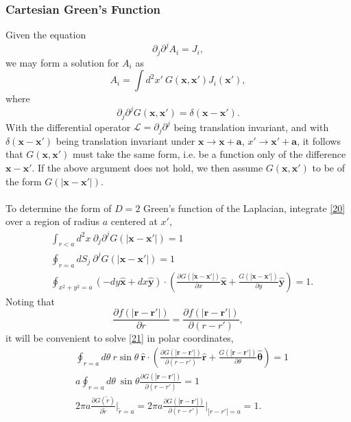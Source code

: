 \documentclass[10pt,letterpaper]{article}
\newcommand{\vect}[1]{\mathbf{#1}}
\newcommand{\vecth}[1]{\hat{\mathbf{#1}}}
\begin{document}
\subsubsection*{Cartesian Green's Function}
Given the equation
\begin{equation}
\partial_j \partial^j A_i = J_i,
\end{equation}
we may form a solution for $A_i$ as
\begin{equation}
A_i = \int d^2x'\ G(\vect x,\vect x') J_i(\vect x'),
\end{equation}
where
\begin{equation}
\partial_j \partial^j G(\vect x,\vect x') = \delta(\vect x-\vect x').\label{20}
\end{equation}
With the differential operator $\mathcal L = \partial_j \partial^j$ being translation invariant, and with $\delta(\vect x-\vect x')$ being translation invariant under $\vect x \to \vect x+\vect a$, $x'\to \vect x'+\vect a$, it follows that $G(\vect x,\vect x')$ must take the same form, i.e. be a function only of the difference $\vect x-\vect x'$. If the above argument does not hold, we then assume $G(\vect x,\vect x')$ to be of the form $G(|\vect x-\vect x'|)$. 
\\ \\
To determine the form of $D=2$ Green's function of the Laplacian, integrate \eqref{20} over a region of radius $a$ centered at $x'$,
\begin{align}
	&\int_{r<a} d^2x\  \partial_j \partial^j G(|\vect x-\vect x'|) = 1\nonumber\\
	&\oint_{r=a} dS_j\ \partial^j  G(|\vect x-\vect x'|)= 1\nonumber\\
	&\oint_{x^2+y^2=a}  \left( -dy \vecth x + dx \vecth y\right) \cdot \left(\frac{\partial G(|\vect x-\vect x'|)}{\partial x} \vecth x +
\frac{G(|\vect x-\vect x'|)}{\partial y}\vecth y\right)=1.\label{21}
\end{align}
Noting that 
\begin{equation}
\frac{\partial f(|\vect r-\vect r'|)}{\partial r} = \frac{\partial f(|\vect r-\vect r'|)}{\partial (r-r')},
\end{equation}
it will be convenient to solve \eqref{21} in polar coordinates,
\begin{align*}
& \oint_{r=a} d\theta \ r \sin\theta\ \vecth r \cdot \left(\frac{\partial G(|\vect r-\vect r'|)}{\partial (r-r')} \vecth r +
\frac{G(|\vect r-\vect r'|)}{\partial \theta }\vecth \theta \right)=1\\
& a\oint_{r=a} d\theta \ \sin\theta \frac{\partial G(|\vect r-\vect r'|)}{\partial (r-r')}=1\\
&2\pi a \frac{\partial G(\tilde r)}{\partial \tilde r}\bigg|_{\tilde r=a} =  2\pi a \frac{\partial G(|\vect r-\vect r'|)}{\partial (r-r')}\bigg|_{|r-r'| =a} =1.
\end{align*}
\end{document}
